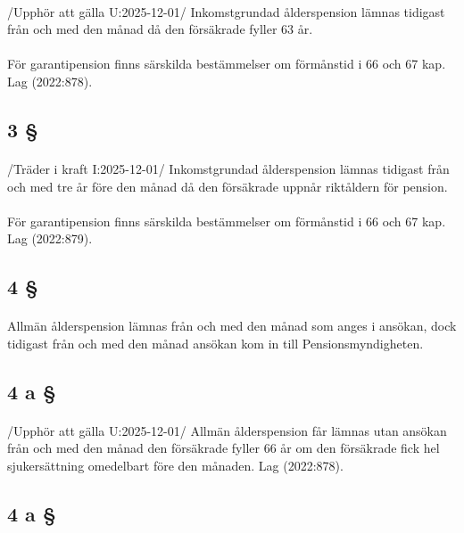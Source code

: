 \documentclass[a4paper,notitlepage,openany,10pt]{book}
\begin{document}
\paragraph*{}
/Upphör att gälla U:2025-12-01/
Inkomstgrundad ålderspension lämnas tidigast från och med den månad då den försäkrade fyller 63 år.
\paragraph*{}
För garantipension finns särskilda bestämmelser om förmånstid i 66 och 67 kap.
Lag (2022:878).
\subsection*{3 §}
\paragraph*{}
/Träder i kraft I:2025-12-01/
Inkomstgrundad ålderspension lämnas tidigast från och med tre år före den månad då den försäkrade uppnår riktåldern för pension.
\paragraph*{}
För garantipension finns särskilda bestämmelser om förmånstid i 66 och 67 kap.
Lag (2022:879).
\subsection*{4 §}
\paragraph*{}
Allmän ålderspension lämnas från och med den månad som anges i ansökan, dock tidigast från och med den månad ansökan kom in till Pensionsmyndigheten.
\subsection*{4 a §}
\paragraph*{}
/Upphör att gälla U:2025-12-01/
Allmän ålderspension får lämnas utan ansökan från och med den månad den försäkrade fyller 66 år om den försäkrade fick hel sjukersättning omedelbart före den månaden.
Lag (2022:878).
\subsection*{4 a §}
\end{document}
